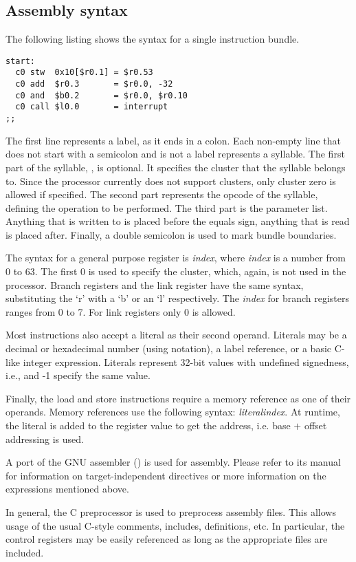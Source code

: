  
\subsection{Assembly syntax}
\label{sec:core-ug-isa-assembly}

The following listing shows the syntax for a single instruction bundle.

\begin{lstlisting}[numbers=none, language=vexasm]
start:
  c0 stw  0x10[$r0.1] = $r0.53
  c0 add  $r0.3       = $r0.0, -32
  c0 and  $b0.2       = $r0.0, $r0.10
  c0 call $l0.0       = interrupt
;;
\end{lstlisting}

\noindent The first line represents a label, as it ends in a colon. Each 
non-empty line that does not start with a semicolon and is not a label 
represents a syllable. The first part of the syllable, , is optional. 
It specifies the cluster that the syllable belongs to. Since the \rvex{} 
processor currently does not support clusters, only cluster zero is allowed if 
specified. The second part represents the opcode of the syllable, defining the 
operation to be performed. The third part is the parameter list. Anything that 
is written to is placed before the equals sign, anything that is read is placed 
after. Finally, a double semicolon is used to mark bundle boundaries.

The syntax for a general purpose register is \textit{index}, where 
\textit{index} is a number from 0 to 63. The first 0 is used to specify the 
cluster, which, again, is not used in the \rvex{} processor. Branch registers 
and the link register have the same syntax, substituting the `r' with a `b' or 
an `l' respectively. The \textit{index} for branch registers ranges from 0 to 7. 
For link registers only 0 is allowed.

Most instructions also accept a literal as their second operand. Literals may be 
a decimal or hexadecimal number (using  notation), a label reference, 
or a basic C-like integer expression. Literals represent 32-bit values with
undefined signedness, i.e.,  and -1 specify the same value.

Finally, the load and store instructions require a memory reference as one of 
their operands. Memory references use the following syntax: 
\textit{literal}\code{[$r0.}\textit{index}\code{]}. At runtime, the literal is 
added to the register value to get the address, i.e. base $+$ offset addressing 
is used.

A port of the GNU assembler () is used for assembly. Please refer to
its manual for information on target-independent directives or more information
on the expressions mentioned above.

In general, the C preprocessor is used to preprocess assembly files. This allows
usage of the usual C-style comments, includes, definitions, etc. In particular,
the control registers may be easily referenced as long as the appropriate files
are included.

